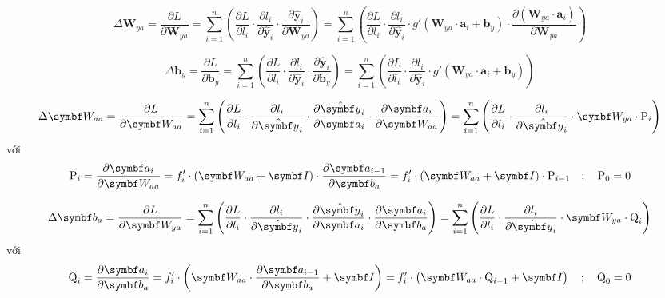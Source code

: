     $$\Delta \symbf W_{ya} = \frac{\partial L}{\partial \symbf W_{ya}}  = \sum_{i=1}^{n}\left(
        \frac{\partial L}{\partial l_i} \cdot
        \frac{\partial l_i}{\partial \hat{\symbf y}_i} \cdot
        \frac{\partial \hat{\symbf y}_i}{\partial \symbf W_{ya}}
     \right) = \sum_{i=1}^{n}\left(
        \frac{\partial L}{\partial l_i} \cdot
        \frac{\partial l_i}{\partial \hat{\symbf y}_i} \cdot
        g'(\symbf W_{ya}\cdot\symbf a_i + \symbf b_y) \cdot
        \frac{\partial (\symbf W_{ya}\cdot\symbf a_i)}{\partial \symbf W_{ya}}
     \right)$$

     $$\Delta \symbf b_y = \frac{\partial L}{\partial \symbf b_y}  = \sum_{i=1}^{n}\left(
        \frac{\partial L}{\partial l_i} \cdot
        \frac{\partial l_i}{\partial \hat{\symbf y}_i} \cdot
        \frac{\partial \hat{\symbf y}_i}{\partial \symbf b_y}
     \right) = \sum_{i=1}^{n}\left(
        \frac{\partial L}{\partial l_i} \cdot
        \frac{\partial l_i}{\partial \hat{\symbf y}_i} \cdot
        g'(\symbf W_{ya}\cdot\symbf a_i + \symbf b_y)
     \right)$$

     $$\Delta \symbf W_{aa} = \frac{\partial L}{\partial \symbf W_{aa}}  = \sum_{i=1}^{n}\left(
        \frac{\partial L}{\partial l_i} \cdot
        \frac{\partial l_i}{\partial \hat{\symbf y}_i} \cdot
        \frac{\partial \hat{\symbf y}_i}{\partial \symbf a_i} \cdot
        \frac{\partial \symbf a_i}{\partial \symbf W_{aa}}
     \right) = \sum_{i=1}^{n}\left(
        \frac{\partial L}{\partial l_i} \cdot
        \frac{\partial l_i}{\partial \hat{\symbf y}_i} \cdot
        \symbf W_{ya} \cdot \text P_i
     \right)$$
     với
     $$\text P_i = \frac{\partial \symbf a_i}{\partial \symbf W_{aa}} = f_i' \cdot \left(\symbf W_{aa}  + \symbf I \right)\cdot \frac{\partial \symbf a_{i-1}}{\partial \symbf b_a} = f_i' \cdot \left(\symbf W_{aa}  + \symbf I \right)\cdot \text P_{i-1} \quad ;\quad  \text P_0 = 0 $$

     $$\Delta \symbf b_a = \frac{\partial L}{\partial \symbf W_{ya}}  = \sum_{i=1}^{n}\left(
        \frac{\partial L}{\partial l_i} \cdot
        \frac{\partial l_i}{\partial \hat{\symbf y}_i} \cdot
        \frac{\partial \hat{\symbf y}_i}{\partial \symbf a_i} \cdot
        \frac{\partial \symbf a_i}{\partial \symbf b_a}
     \right) = \sum_{i=1}^{n}\left(
        \frac{\partial L}{\partial l_i} \cdot
        \frac{\partial l_i}{\partial \hat{\symbf y}_i} \cdot
        \symbf W_{ya} \cdot \text Q_i
     \right)$$
     với
     $$\text Q_i = \frac{\partial \symbf a_i}{\partial \symbf b_a} = f_i' \cdot \left(\symbf W_{aa} \cdot \frac{\partial \symbf a_{i-1}}{\partial \symbf b_a} + \symbf I \right) = f_i' \cdot \left(\symbf W_{aa} \cdot \text Q_{i-1} + \symbf I \right)\quad ;\quad \text Q_0 = 0 $$

